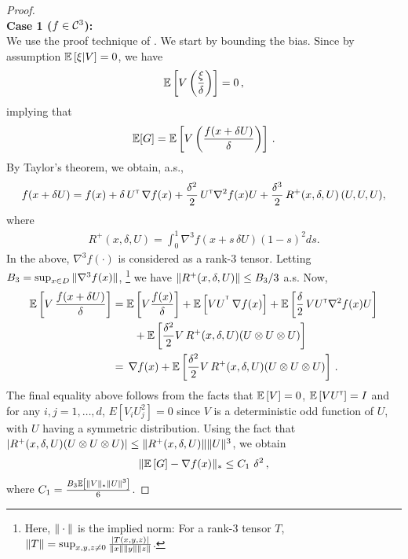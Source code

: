 \begin{proof}\ \\
\textbf{Case 1 ($f \in \mathcal{C}^3$): }\ \\
We use the proof technique of \cite{spall1997one}.
We start by bounding the bias.
Since by assumption $\mathbb{E}\left[ \xi|V\right]=0$, we have
\begin{align*}
\mathbb{E}\left[  V\left(\dfrac{\xi}{\delta}\right) \right]= 0\,,
\end{align*}
implying that
\begin{align*}
\mathbb{E}[G] =  \mathbb{E}\left[ V \left(\dfrac{f(x+\delta U) }{\delta}\right)\right] \,.
\end{align*}
By Taylor's theorem, we obtain, a.s.,
\begin{align*}
f(x + \delta U) =
 f(x)
 +\delta\,  U^\mathsf{\scriptscriptstyle T}\,\nabla f(x)
  + \frac{\delta^2}{2}\, U^\mathsf{\scriptscriptstyle T} \nabla^2 f(x) U
  +  \frac{\delta^3}{2} \, R^{+}(x,\delta,U) \,(U, U, U),
\end{align*}
where
\begin{align}
 R^{+}(x,\delta,U)= \int_0^1  \nabla^3 f(  x + s \, \delta U ) (1-s)^2 ds. \label{eq:taylor-r}
\end{align}
In the above, $\nabla^3 f(\cdot)$ is considered as a rank-3 tensor.
Letting $B_3 = \sup_{x\in D} \| \nabla^3 f(x) \|$,%
\footnote{Here, $\|\cdot\|$ is the implied norm: For a rank-3 tensor $T$, $\|T\| = \sup_{x,y,z\ne 0}
\frac{|T (x,y,z)|}{\|x\|\|y\|\|z\|}$.
}
we have $\| R^{+}(x,\delta,U)\| \le B_3/3$ a.s.
Now,
\begin{align*}
\mathbb{E}\left[V\, \dfrac{f(x+\delta U)}{\delta}\right]
&= \mathbb{E}\left[V \frac{f(x)}{\delta}\right] +  \mathbb{E}\left[VU^{^\mathsf{\scriptscriptstyle T}}
\, \nabla f(x)\right]  + \mathbb{E}\left[\frac{\delta}{2}\, V U^\mathsf{\scriptscriptstyle T} \nabla^2 f(x) U\right] \\
&\qquad+   \mathbb{E}\left[\frac{\delta^2}{2}  V \,R^{+}(x,\delta,U)(U \otimes U \otimes U)\right]
\\
&= \, \nabla f(x)  + \mathbb{E}\left[\frac{\delta^2}{2}  V \,R^{+}(x,\delta,U)(U \otimes U \otimes U)\right]\,.
\end{align*}
The final equality above follows from the facts that $\mathbb{E}\left[V\right] = 0$, $\mathbb{E}\left[V U^\mathsf{\scriptscriptstyle T}\right] = I$ and for any $i,j=1,\ldots,d$, $E[V_i U_j^2] = 0$ since $V$ is a deterministic odd function of $U$, with $U$ having a symmetric distribution.
Using the fact that $|R^{+}(x,\delta,U) (U \otimes U \otimes U)| \le
\|R^{+}(x,\delta,U)\| \|U\|^3$,
we obtain
\begin{align*}
\| \mathbb{E}\left[ G \right] - \nabla f(x) \|_*
\le C_1\,\, \delta^2 \,,
\end{align*}
where $C_1 = \frac{B_3 \mathbb{E}\left[ \|V\|_* \|U\|^3 \right]}{6}$.


\end{proof}
